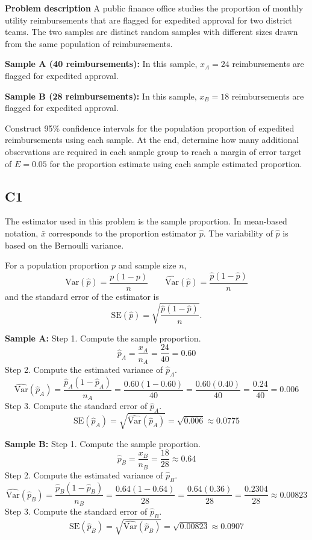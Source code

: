 \begin{ExamProblems}
		\newpage
		\item
		\textbf{Problem description}
		A public finance office studies the proportion of monthly utility reimbursements that are flagged for expedited approval for two district teams.
		The two samples are distinct random samples with different sizes drawn from the same population of reimbursements.
		
		\textbf{Sample A (40 reimbursements):}
		In this sample, $x_A = 24$ reimbursements are flagged for expedited approval.
		
		\textbf{Sample B (28 reimbursements):}
		In this sample, $x_B = 18$ reimbursements are flagged for expedited approval.
		
		Construct 95\% confidence intervals for the population proportion of expedited reimbursements using each sample.
		At the end, determine how many additional observations are required in each sample group to reach a margin of error target of $E = 0.05$ for the proportion estimate using each sample estimated proportion.
		
		\subsection*{C1}
		The estimator used in this problem is the sample proportion.
		In mean-based notation, $\bar{x}$ corresponds to the proportion estimator $\hat{p}$.
		The variability of $\hat{p}$ is based on the Bernoulli variance.
		
		For a population proportion $p$ and sample size $n$,
		\[
		\mathrm{Var}(\hat{p}) = \frac{p(1-p)}{n}
		\qquad
		\widehat{\mathrm{Var}}(\hat{p}) = \frac{\hat{p}(1-\hat{p})}{n}
		\]
		and the standard error of the estimator is
		\[
		\mathrm{SE}(\hat{p}) = \sqrt{\frac{\hat{p}(1-\hat{p})}{n}}.
		\]
		
		\textbf{Sample A:}
		Step 1.
		Compute the sample proportion.
		\[
		\hat{p}_A = \frac{x_A}{n_A} = \frac{24}{40} = 0.60
		\]
		Step 2.
		Compute the estimated variance of $\hat{p}_A$.
		\[
		\widehat{\mathrm{Var}}(\hat{p}_A) = \frac{\hat{p}_A(1-\hat{p}_A)}{n_A}
		= \frac{0.60(1-0.60)}{40}
		= \frac{0.60(0.40)}{40}
		= \frac{0.24}{40}
		= 0.006
		\]
		Step 3.
		Compute the standard error of $\hat{p}_A$.
		\[
		\mathrm{SE}(\hat{p}_A) = \sqrt{\widehat{\mathrm{Var}}(\hat{p}_A)}
		= \sqrt{0.006}
		\approx 0.0775
		\]
		
		\textbf{Sample B:}
		Step 1.
		Compute the sample proportion.
		\[
		\hat{p}_B = \frac{x_B}{n_B} = \frac{18}{28} \approx 0.64
		\]
		Step 2.
		Compute the estimated variance of $\hat{p}_B$.
		\[
		\widehat{\mathrm{Var}}(\hat{p}_B) = \frac{\hat{p}_B(1-\hat{p}_B)}{n_B}
		= \frac{0.64(1-0.64)}{28}
		= \frac{0.64(0.36)}{28}
		= \frac{0.2304}{28}
		\approx 0.00823
		\]
		Step 3.
		Compute the standard error of $\hat{p}_B$.
		\[
		\mathrm{SE}(\hat{p}_B) = \sqrt{\widehat{\mathrm{Var}}(\hat{p}_B)}
		= \sqrt{0.00823}
		\approx 0.0907
		\]
		

\end{ExamProblems}
